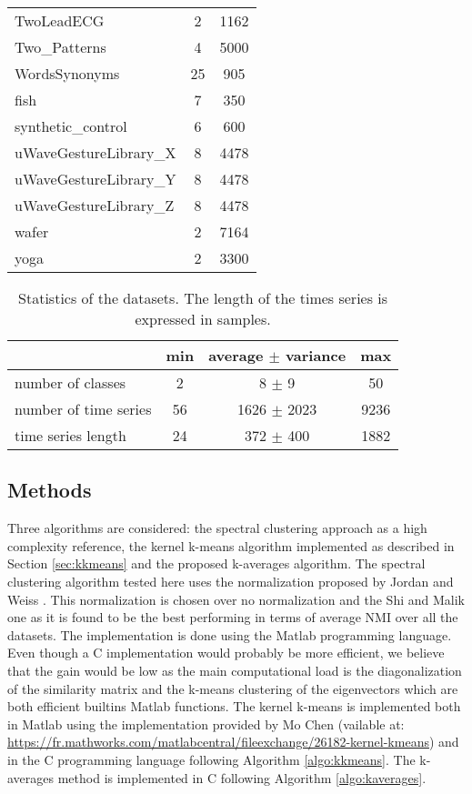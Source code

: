 \documentclass[10pt,letterpaper]{article}
\begin{document}
\begin{table} [h!]
\begin{center}
\begin{tabular}{lcc}
TwoLeadECG  &  2 & 1162 \\
Two\_Patterns  &  4 & 5000 \\
WordsSynonyms  & 25 &  905 \\
fish  &  7 &  350 \\
synthetic\_control  &  6 &  600 \\
uWaveGestureLibrary\_X  &  8 & 4478 \\
uWaveGestureLibrary\_Y  &  8 & 4478 \\
uWaveGestureLibrary\_Z  &  8 & 4478 \\
wafer  &  2 & 7164 \\
yoga  &  2 & 3300 \\
\end{tabular}
\end{center}
\end{table}


\begin{table}
\center
\caption{\label{tab:dbs} Statistics of the datasets. The length of the times series is expressed in samples.}
\begin{tabular}{l|ccc}
& min & average $\pm$ variance & max \\
\hline
number of classes & 2 & 8 $\pm$ 9 & 50 \\
number of time series & 56 & 1626 $\pm$ 2023 & 9236 \\
time series length & 24 & 372 $\pm$ 400 & 1882 \\
\end{tabular}
\end{table}

\subsection{Methods}

Three algorithms are considered: the spectral clustering \cite{von2007tutorial} approach as a high complexity reference, the kernel k-means algorithm implemented as described in Section \ref{sec:kkmeans} and the proposed k-averages algorithm. The spectral clustering algorithm tested here uses the normalization proposed by Jordan and Weiss \cite{ng2002spectral}. This normalization is chosen over no normalization and the Shi and Malik one \cite{shi2000normalized} as it is found to be the best performing in terms of average NMI over all the datasets. The implementation is done using the Matlab programming language. Even though a C implementation would probably be more efficient, we believe that the gain would be low as the main computational load is the diagonalization of the similarity matrix and the k-means clustering of the eigenvectors which are both efficient builtins Matlab functions. The kernel k-means is implemented both in Matlab using the implementation provided by Mo Chen (vailable at: \url{https://fr.mathworks.com/matlabcentral/fileexchange/26182-kernel-kmeans}) and in the C programming language following Algorithm \ref{algo:kkmeans}. The k-averages method is implemented in C following Algorithm \ref{algo:kaverages}.
\end{document}
